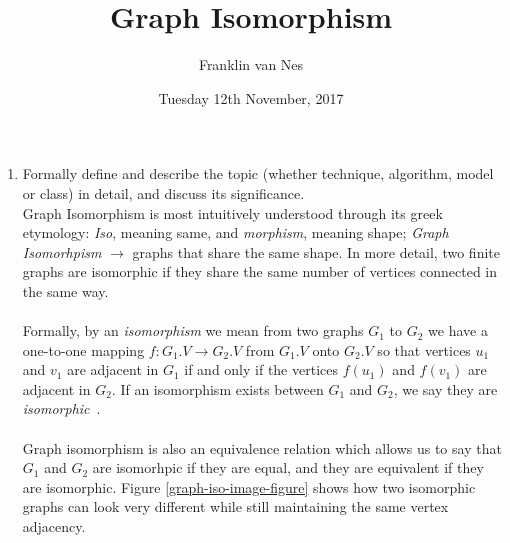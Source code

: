 \documentclass[letterpaper, 12pt]{article}
\begin{document}
\title{Graph Isomorphism}
\author{Franklin van Nes}
\date{Tuesday 12th November, 2017}
\maketitle

\begin{enumerate}
    \item Formally define and describe the topic (whether technique, algorithm, model or class) in detail, and discuss its significance.
    \\
    Graph Isomorphism is most intuitively understood through its greek etymology: \textit{Iso}, meaning
     same, and \textit{morphism}, meaning shape; \textit{Graph Isomorhpism} $\rightarrow$ graphs that share the same shape.
    In more detail, two finite graphs are isomorphic if they share the same number of vertices connected in the same way.
    \\\\
    Formally, by an \textit{isomorphism} we mean from two graphs $G_1$ to $G_2$ we have a one-to-one mapping $f: G_1.V \rightarrow G_2.V$ from $G_1.V$ onto $G_2.V$ so
    that vertices $u_1$ and $v_1$ are adjacent in $G_1$ if and only if the vertices $f(u_1)$ and $f(v_1)$ are adjacent in $G_2$.
    If an isomorphism exists between $G_1$ and $G_2$, we say they are \textit{isomorphic}~\cite{gary-definer}.
    \\\\
     Graph isomorphism is also an equivalence relation which allows us to say that $G_1$ and $G_2$ are isomorhpic if they are equal, and they are equivalent if they are isomorphic.
    Figure \ref{graph-iso-image-figure} shows how two isomorphic graphs can look very different while still maintaining the same vertex adjacency.


\end{enumerate}
\end{document}
